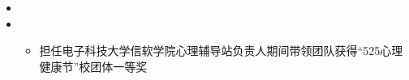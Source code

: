   \begin{itemize}[leftmargin=*]
  \item
  \item
      {\small
      \begin{itemize}
        \item 担任电子科技大学信软学院心理辅导站负责人期间带领团队获得“525心理健康节”校团体一等奖
      \end{itemize}
      } 
  \end{itemize}
